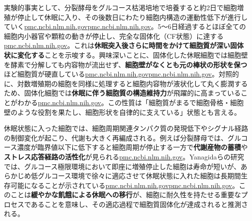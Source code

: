 実験的事実として、分裂酵母をグルコース枯渇培地で培養すると約2日で細胞増殖が停止して休眠に入り、その後数日にわたり細胞内構造の運動性低下が進行していく\href{https://pmc.ncbi.nlm.nih.gov/articles/PMC6857596/\#:~:text=Starved\%20cells\%20have\%20two\%20intracellular,immobilisation\%20states}{pmc.ncbi.nlm.nih.gov}\href{https://pmc.ncbi.nlm.nih.gov/articles/PMC6857596/\#:~:text=starvation,SD3\%20and\%20SD4\%2C\%20LDs\%20showed}{pmc.ncbi.nlm.nih.gov}。5～6日経過するとほぼ全ての細胞内小器官や顆粒の動きが停止し、完全な固体化（CF状態）に達する\href{https://pmc.ncbi.nlm.nih.gov/articles/PMC6857596/\#:~:text=constant\%20\%28Fig,Movie\%201\%3B\%20\%2059\%20Fig}{pmc.ncbi.nlm.nih.gov}。これは\textbf{休眠突入後さらに時間をかけて細胞質が深い固体状に変化する}ことを示唆する。興味深いことに、固体化した休眠細胞では細胞壁を酵素で分解しても内容物が流出せず、\textbf{細胞壁がなくとも元の棒状の形状を保つ}ほど細胞質が硬直している\href{https://pmc.ncbi.nlm.nih.gov/articles/PMC6857596/\#:~:text=spherical\%20shape,cells\%2C\%20the\%20majority\%20of\%20CF}{pmc.ncbi.nlm.nih.gov}\href{https://pmc.ncbi.nlm.nih.gov/articles/PMC6857596/\#:~:text=spherical\%20shape\%2C\%20CF\%20cells\%20slipped,Fig}{pmc.ncbi.nlm.nih.gov}。対照的に、対数増殖期の細胞を同様に処理すると細胞内容物が液状化して丸く膨潤するため、固体化細胞では\textbf{休眠に伴う細胞質の構造維持力}が飛躍的に高まっていることがわかる\href{https://pmc.ncbi.nlm.nih.gov/articles/PMC6857596/\#:~:text=spherical\%20shape,cells\%2C\%20the\%20majority\%20of\%20CF}{pmc.ncbi.nlm.nih.gov}。この性質は「細胞質がまるで細胞骨格・細胞壁のような役割を果たし、細胞形状を自律的に支えている」状態とも言える。

休眠状態に入った細胞では、細胞周期関連タンパク質の発現低下やシグナル経路の制御変化が起こり、代謝も大きく再編成される。例えば分裂酵母では、グルコース濃度が臨界値以下に低下すると細胞周期が停止する一方で\textbf{代謝産物の蓄積}や\textbf{ストレス応答経路の活性化}が見られる\href{https://pmc.ncbi.nlm.nih.gov/articles/PMC3123465/\#:~:text=stochastic\%2C\%20accompanied\%20by\%20a\%20curious,choline\%29\%2C\%20which\%20increased\%20or}{pmc.ncbi.nlm.nih.gov}。Yanagidaらの研究では、グルコース極限環境において即座に増殖停止した細胞は寿命が短いが、あらかじめ低グルコース環境で徐々に適応させて休眠状態に入れた細胞は長期間生存可能になることが示されている\href{https://pmc.ncbi.nlm.nih.gov/articles/PMC3123465/\#:~:text=narrow\%20range\%20of\%20concentrations\%20\%282,choline\%29\%2C\%20which\%20increased\%20or}{pmc.ncbi.nlm.nih.gov}\href{https://pmc.ncbi.nlm.nih.gov/articles/PMC3123465/\#:~:text=divided,choline\%29\%2C\%20which\%20increased\%20or}{pmc.ncbi.nlm.nih.gov}。このことは\textbf{緩やかな飢餓による休眠への移行}が、細胞に耐久性を持たせる重要なプロセスであることを意味し、その適応過程で細胞質固体化が達成されると推測される。

